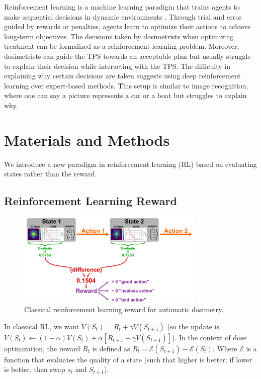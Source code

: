 Reinforcement learning is a machine learning paradigm that trains agents to make sequential decisions in dynamic environments \cite{brooks_what_2021}.
Through trial and error guided by rewards or penalties, agents learn to optimize their actions to achieve long-term objectives.
The decisions taken by dosimetrists when optimizing treatment can be formalized as a reinforcement learning problem.
Moreover, dosimetrists can guide the TPS towards an acceptable plan but usually struggle to explain their decision while interacting with the TPS.
The difficulty in explaining why certain decisions are taken suggests using deep reinforcement learning over expert-based methods.
This setup is similar to image recognition, where one can say a picture represents a car or a boat but struggles to explain why.

\section{Materials and Methods}
We introduce a new paradigm in reinforcement learning (RL) based on evaluating states rather than the reward.

\subsection{Reinforcement Learning Reward}

\begin{figure}
	\centering
	\includegraphics[width=0.8\textwidth]{reward.pdf}
	\caption{Classical reinforcement learning reward for automatic dosimetry.}
	\label{fig:reward_fig}
\end{figure}

In classical RL, we want $V(S_t) = R_t + \gamma V(S_{t+1})$
(so the update is $V(S_t) \leftarrow (1-\alpha) V(S_t) + \alpha \left[ R_{t+1} + \gamma V(S_{t+1}) \right]$).
In the context of dose optimization, the reward $R_t$ is defined as $R_t = \mathcal{E}(S_{t+1}) - \mathcal{E}(S_t)$.
Where $\mathcal{E}$ is a function that evaluates the quality of a state (such that higher is better; if lower is better, then swap $s_t$ and $S_{t+1}$).

